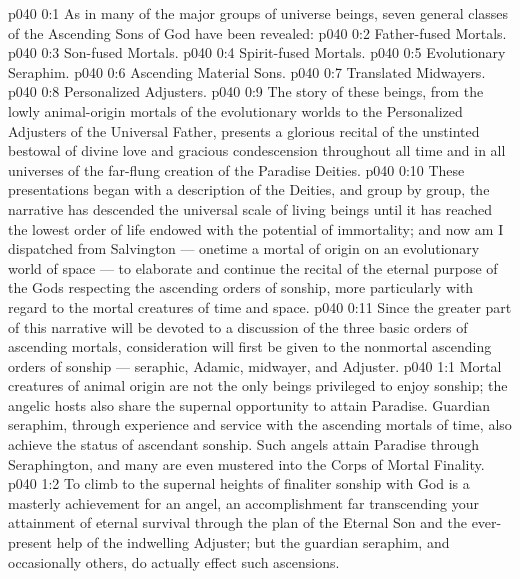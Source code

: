 \author{Mighty Messenger}
\vs p040 0:1 As in many of the major groups of universe beings, seven general classes of the Ascending Sons of God have been revealed:
\vs p040 0:2 \bibnobreakspace Father\hyp{}fused Mortals.
\vs p040 0:3 \bibnobreakspace Son\hyp{}fused Mortals.
\vs p040 0:4 \bibnobreakspace Spirit\hyp{}fused Mortals.
\vs p040 0:5 \bibnobreakspace Evolutionary Seraphim.
\vs p040 0:6 \bibnobreakspace Ascending Material Sons.
\vs p040 0:7 \bibnobreakspace Translated Midwayers.
\vs p040 0:8 \bibnobreakspace Personalized Adjusters.
\vs p040 0:9 \pc The story of these beings, from the lowly animal\hyp{}origin mortals of the evolutionary worlds to the Personalized Adjusters of the Universal Father, presents a glorious recital of the unstinted bestowal of divine love and gracious condescension throughout all time and in all universes of the far\hyp{}flung creation of the Paradise Deities.
\vs p040 0:10 These presentations began with a description of the Deities, and group by group, the narrative has descended the universal scale of living beings until it has reached the lowest order of life endowed with the potential of immortality; and now am I dispatched from Salvington --- onetime a mortal of origin on an evolutionary world of space --- to elaborate and continue the recital of the eternal purpose of the Gods respecting the ascending orders of sonship, more particularly with regard to the mortal creatures of time and space.
\vs p040 0:11 Since the greater part of this narrative will be devoted to a discussion of the three basic orders of ascending mortals, consideration will first be given to the nonmortal ascending orders of sonship --- seraphic, Adamic, midwayer, and Adjuster.
\vs p040 1:1 Mortal creatures of animal origin are not the only beings privileged to enjoy sonship; the angelic hosts also share the supernal opportunity to attain Paradise. Guardian seraphim, through experience and service with the ascending mortals of time, also achieve the status of ascendant sonship. Such angels attain Paradise through Seraphington, and many are even mustered into the Corps of Mortal Finality.
\vs p040 1:2 To climb to the supernal heights of finaliter sonship with God is a masterly achievement for an angel, an accomplishment far transcending your attainment of eternal survival through the plan of the Eternal Son and the ever\hyp{}present help of the indwelling Adjuster; but the guardian seraphim, and occasionally others, do actually effect such ascensions.
